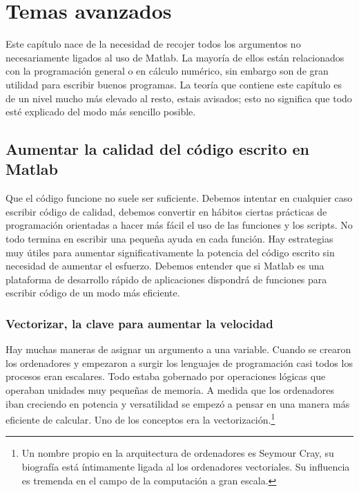 
\chapter{Temas avanzados}


Este capítulo nace de la necesidad de recojer todos los argumentos no
necesariamente ligados al uso de Matlab. La mayoría de ellos están
relacionados con la programación general o en cálculo numérico, sin
embargo son de gran utilidad para escribir buenos programas. La teoría
que contiene este capítulo es de un nivel mucho más elevado al resto,
estais avisados; esto no significa que todo esté explicado del modo
más sencillo posible.

\section{Aumentar la calidad del código escrito en Matlab}

Que el código funcione no suele ser suficiente. Debemos intentar en
cualquier caso escribir código de calidad, debemos convertir en
hábitos ciertas prácticas de programación orientadas a hacer más fácil
el uso de las funciones y los scripts. No todo termina en escribir una
pequeña ayuda en cada función. Hay estrategias muy útiles para
aumentar significativamente la potencia del código escrito sin
necesidad de aumentar el esfuerzo. Debemos entender que si Matlab es
una plataforma de desarrollo rápido de aplicaciones dispondrá de
funciones para escribir código de un modo más eficiente.

\subsection{Vectorizar, la clave para aumentar la velocidad}

Hay muchas maneras de asignar un argumento a una variable. Cuando se
crearon los ordenadores y empezaron a surgir los lenguajes de
programación casi todos los procesos eran escalares. Todo estaba
gobernado por operaciones lógicas que operaban unidades muy pequeñas
de memoria.  A medida que los ordenadores iban creciendo en potencia y
versatilidad se empezó a pensar en una manera más eficiente de
calcular. Uno de los conceptos era la vectorización.\footnote{ Un
  nombre propio en la arquitectura de ordenadores es Seymour Cray, su
  biografía está íntimamente ligada al los ordenadores vectoriales.
  Su influencia es tremenda en el campo de la computación a gran
  escala. }

